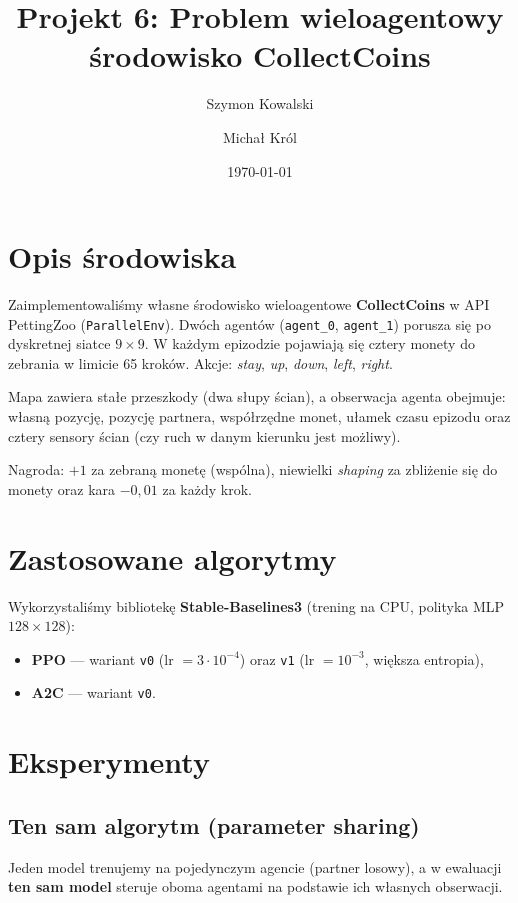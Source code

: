 \documentclass[a4paper,11pt]{article}
\title{Projekt 6: Problem wieloagentowy\\środowisko CollectCoins}
\author{Szymon Kowalski \and Michał Król}
\date{\today}
\begin{document}
\maketitle

\section{Opis środowiska}

Zaimplementowaliśmy własne środowisko wieloagentowe \textbf{CollectCoins} w API PettingZoo (\texttt{ParallelEnv}).
Dwóch agentów (\texttt{agent\_0}, \texttt{agent\_1}) porusza się po dyskretnej siatce $9\times9$.
W każdym epizodzie pojawiają się cztery monety do zebrania w limicie 65 kroków.
Akcje: \emph{stay}, \emph{up}, \emph{down}, \emph{left}, \emph{right}.

Mapa zawiera stałe przeszkody (dwa słupy ścian), a obserwacja agenta obejmuje:
własną pozycję, pozycję partnera, współrzędne monet, ułamek czasu epizodu
oraz cztery sensory ścian (czy ruch w danym kierunku jest możliwy).

Nagroda: $+1$ za zebraną monetę (wspólna), niewielki \emph{shaping} za zbliżenie się do monety
oraz kara $-0{,}01$ za każdy krok.

\section{Zastosowane algorytmy}

Wykorzystaliśmy bibliotekę \textbf{Stable-Baselines3} (trening na CPU, polityka MLP $128\times128$):
\begin{itemize}
  \item \textbf{PPO} --- wariant \texttt{v0} (lr $=3\cdot10^{-4}$) oraz \texttt{v1} (lr $=10^{-3}$, większa entropia),
  \item \textbf{A2C} --- wariant \texttt{v0}.
\end{itemize}

\section{Eksperymenty}

\subsection{Ten sam algorytm (parameter sharing)}
Jeden model trenujemy na pojedynczym agencie (partner losowy), a w ewaluacji
\textbf{ten sam model} steruje oboma agentami na podstawie ich własnych obserwacji.
\end{document}
